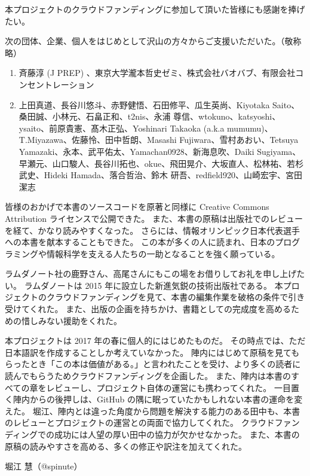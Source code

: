 本プロジェクトのクラウドファンディングに参加して頂いた皆様にも感謝を捧げたい。

次の団体、企業、個人をはじめとして沢山の方々からご支援いただいた。（敬称略） %
\begin{enumerate}
\item 斉藤淳 (J PREP) 、東京大学瀧本哲史ゼミ、株式会社バオバブ、有限会社コンセントレーション
\item 上田真道、長谷川悠斗、赤野健悟、石田修平、瓜生英尚、Kiyotaka Saito、桑田誠、小林元、石畠正和、t2nis、永浦 尊信、wtokuno、katsyoshi、ysaito、前原貴憲、髙木正弘、Yoshinari Takaoka (a.k.a mumumu)、T.Miyazawa、佐藤怜、田中哲朗、Masashi Fujiwara、雪村あおい、Tetsuya Yamazaki、永本、武平佑太、Yamachan0928、新海息吹、Daiki Sugiyama、早瀬元、山口駿人、長谷川拓也、okue、飛田晃介、大坂直人、松林祐、若杉武史、Hideki Hamada、落合哲治、鈴木 研吾、redfield920、山崎宏宇、宮田潔志
\end{enumerate}

皆様のおかげで本書のソースコードを原著と同様に Creative Commons Attribution ライセンスで公開できた。
また、本書の原稿は出版社でのレビューを経て、かなり読みやすくなった。
さらには、情報オリンピック日本代表選手への本書を献本することもできた。
この本が多くの人に読まれ、日本のプログラミングや情報科学を支える人たちの一助となることを強く願っている。

ラムダノート社の鹿野さん、高尾さんにもこの場をお借りしてお礼を申し上げたい。
ラムダノートは 2015 年に設立した新進気鋭の技術出版社である。
本プロジェクトのクラウドファンディングを見て、本書の編集作業を破格の条件で引き受けてくれた。
また、出版の企画を持ちかけ、書籍としての完成度を高めるための惜しみない援助をくれた。

本プロジェクトは 2017 年の春に個人的にはじめたものだ。
その時点では、ただ日本語訳を作成することしか考えていなかった。
陣内にはじめて原稿を見てもらったとき「この本は価値がある。」と言われたことを受け、より多くの読者に読んでもらうためクラウドファンディングを企画した。
また、陣内は本書のすべての章をレビューし、プロジェクト自体の運営にも携わってくれた。
一目置く陣内からの後押しは、GitHub の隅に眠っていたかもしれない本書の運命を変えた。
堀江、陣内とは違った角度から問題を解決する能力のある田中も、本書のレビューとプロジェクトの運営との両面で協力してくれた。
クラウドファンディングでの成功には人望の厚い田中の協力が欠かせなかった。
また、本書の原稿の読みやすさを高める、多くの修正や訳注を加えてくれた。

堀江 慧（@spinute）
